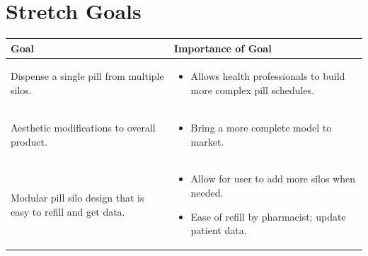\documentclass[12pt,titlepage]{article}
\begin{document}
\section{Stretch Goals}
\begin{center}
\begin{adjustbox}{max width=0.85\textwidth}
\small
\begin{tabular}{|p{}|p{}|}
 \hline
 \textbf{Goal} & \textbf{Importance of Goal} \\ 
 \hline
 Dispense a single pill from multiple silos. &
\begin{itemize}[noitemsep,topsep=0pt,leftmargin=13pt]
  \item Allows health professionals to build more complex pill schedules.
  \end{itemize}\\ 
 \hline
 Aesthetic modifications to overall product. & 
\begin{itemize}[noitemsep,topsep=0pt,leftmargin=13pt]
  \item Bring a more complete model to market.
  \end{itemize}\\ 
 \hline
Modular pill silo design that is easy to refill and get data. & 
\begin{itemize}[noitemsep,topsep=0pt,leftmargin=13pt]
  \item Allow for user to add more silos when needed.
  \item Ease of refill by pharmacist; update patient data.
  \end{itemize}\\ 
 \hline
\end{tabular}
\end{adjustbox}
\end{center}
\end{document}
